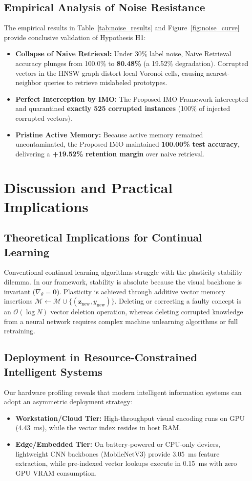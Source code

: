 \documentclass[sn-mathphys,Numbered]{sn-jnl}
\begin{document}
\subsection{Empirical Analysis of Noise Resistance}
The empirical results in Table~\ref{tab:noise_results} and Figure~\ref{fig:noise_curve} provide conclusive validation of Hypothesis H1:
\begin{itemize}
    \item \textbf{Collapse of Naive Retrieval:} Under 30\% label noise, Naive Retrieval accuracy plunges from 100.0\% to \textbf{80.48\%} (a 19.52\% degradation). Corrupted vectors in the HNSW graph distort local Voronoi cells, causing nearest-neighbor queries to retrieve mislabeled prototypes.
    \item \textbf{Perfect Interception by IMO:} The Proposed IMO Framework intercepted and quarantined \textbf{exactly 525 corrupted instances} (100\% of injected corrupted vectors).
    \item \textbf{Pristine Active Memory:} Because active memory remained uncontaminated, the Proposed IMO maintained \textbf{100.00\% test accuracy}, delivering a \textbf{+19.52\% retention margin} over naive retrieval.
\end{itemize}


\section{Discussion and Practical Implications}\label{sec:discussion}

\subsection{Theoretical Implications for Continual Learning}
Conventional continual learning algorithms struggle with the plasticity-stability dilemma. In our framework, stability is absolute because the visual backbone is invariant ($\nabla_\theta = \mathbf{0}$). Plasticity is achieved through additive vector memory insertions $\mathcal{M} \leftarrow \mathcal{M} \cup \{(\mathbf{z}_{\text{new}}, y_{\text{new}})\}$. Deleting or correcting a faulty concept is an $\mathcal{O}(\log N)$ vector deletion operation, whereas deleting corrupted knowledge from a neural network requires complex machine unlearning algorithms or full retraining.

\subsection{Deployment in Resource-Constrained Intelligent Systems}
Our hardware profiling reveals that modern intelligent information systems can adopt an asymmetric deployment strategy:
\begin{itemize}
    \item \textbf{Workstation/Cloud Tier:} High-throughput visual encoding runs on GPU (4.43~ms), while the vector index resides in host RAM.
    \item \textbf{Edge/Embedded Tier:} On battery-powered or CPU-only devices, lightweight CNN backbones (MobileNetV3) provide 3.05~ms feature extraction, while pre-indexed vector lookups execute in 0.15~ms with zero GPU VRAM consumption.
\end{itemize}
\end{document}
